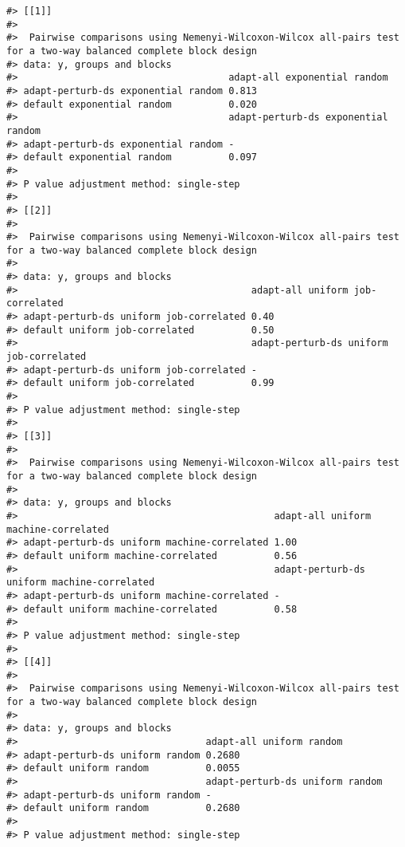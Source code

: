 \documentclass[
]{article}
\begin{document}
\begin{verbatim}
#> [[1]]
#> 
#>  Pairwise comparisons using Nemenyi-Wilcoxon-Wilcox all-pairs test for a two-way balanced complete block design
#> data: y, groups and blocks
#>                                     adapt-all exponential random
#> adapt-perturb-ds exponential random 0.813                       
#> default exponential random          0.020                       
#>                                     adapt-perturb-ds exponential random
#> adapt-perturb-ds exponential random -                                  
#> default exponential random          0.097
#> 
#> P value adjustment method: single-step
#> 
#> [[2]]
#> 
#>  Pairwise comparisons using Nemenyi-Wilcoxon-Wilcox all-pairs test for a two-way balanced complete block design
#> 
#> data: y, groups and blocks
#>                                         adapt-all uniform job-correlated
#> adapt-perturb-ds uniform job-correlated 0.40                            
#> default uniform job-correlated          0.50                            
#>                                         adapt-perturb-ds uniform job-correlated
#> adapt-perturb-ds uniform job-correlated -                                      
#> default uniform job-correlated          0.99
#> 
#> P value adjustment method: single-step
#> 
#> [[3]]
#> 
#>  Pairwise comparisons using Nemenyi-Wilcoxon-Wilcox all-pairs test for a two-way balanced complete block design
#> 
#> data: y, groups and blocks
#>                                             adapt-all uniform machine-correlated
#> adapt-perturb-ds uniform machine-correlated 1.00                                
#> default uniform machine-correlated          0.56                                
#>                                             adapt-perturb-ds uniform machine-correlated
#> adapt-perturb-ds uniform machine-correlated -                                          
#> default uniform machine-correlated          0.58
#> 
#> P value adjustment method: single-step
#> 
#> [[4]]
#> 
#>  Pairwise comparisons using Nemenyi-Wilcoxon-Wilcox all-pairs test for a two-way balanced complete block design
#> 
#> data: y, groups and blocks
#>                                 adapt-all uniform random
#> adapt-perturb-ds uniform random 0.2680                  
#> default uniform random          0.0055                  
#>                                 adapt-perturb-ds uniform random
#> adapt-perturb-ds uniform random -                              
#> default uniform random          0.2680
#> 
#> P value adjustment method: single-step
\end{verbatim}
\end{document}

